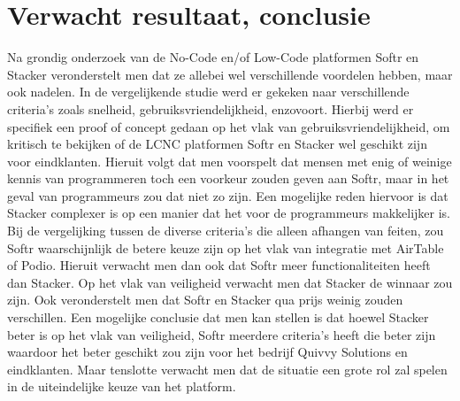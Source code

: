 \section{Verwacht resultaat, conclusie}%
\label{sec:verwachte_resultaten}
Na grondig onderzoek van de No-Code en/of Low-Code platformen Softr en Stacker veronderstelt men dat ze allebei wel verschillende voordelen hebben, maar ook nadelen.
In de vergelijkende studie werd er gekeken naar verschillende criteria's zoals snelheid, gebruiksvriendelijkheid, enzovoort. Hierbij werd er specifiek een proof of concept gedaan op het vlak van gebruiksvriendelijkheid, om kritisch te bekijken of de LCNC platformen Softr en Stacker wel geschikt zijn voor eindklanten.
Hieruit volgt dat men voorspelt dat mensen met enig of weinige kennis van programmeren toch een voorkeur zouden geven aan Softr, maar in het geval van programmeurs zou dat niet zo zijn. Een mogelijke reden hiervoor is dat Stacker complexer is op een manier dat het voor de programmeurs makkelijker is.
Bij de vergelijking tussen de diverse criteria's die alleen afhangen van feiten, zou Softr waarschijnlijk de betere keuze zijn op het vlak van integratie met AirTable of Podio. Hieruit verwacht men dan ook dat Softr meer functionaliteiten heeft dan Stacker. Op het vlak van veiligheid verwacht men dat Stacker de winnaar zou zijn.
Ook veronderstelt men dat Softr en Stacker qua prijs weinig zouden verschillen. Een mogelijke conclusie dat men kan stellen is dat hoewel Stacker beter is op het vlak van veiligheid, Softr meerdere criteria's heeft die beter zijn waardoor het beter geschikt zou zijn voor het bedrijf Quivvy Solutions en eindklanten.
Maar tenslotte verwacht men dat de situatie een grote rol zal spelen in de uiteindelijke keuze van het platform.






